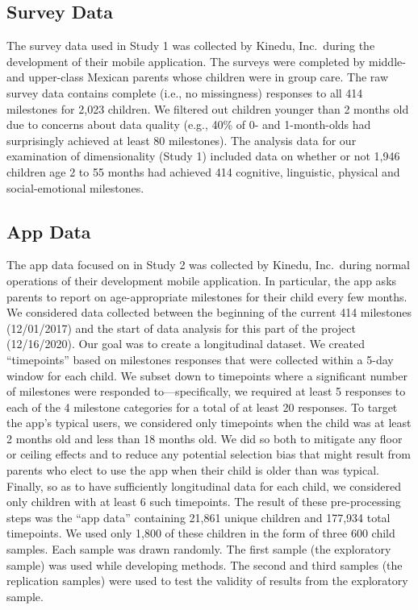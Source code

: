 \documentclass[man]{apa7}
\begin{document}
\subsection*{Survey Data}

The survey data used in Study 1 was collected by Kinedu, Inc.~during the
development of their mobile application. The surveys were completed by
middle- and upper-class Mexican parents whose children were in group
care. The raw survey data contains complete (i.e., no missingness)
responses to all 414 milestones for 2,023 children. We filtered out
children younger than 2 months old due to concerns about data quality
(e.g., 40\% of 0- and 1-month-olds had surprisingly achieved at least 80
milestones). The analysis data for our examination of dimensionality
(Study 1) included data on whether or not 1,946 children age 2 to 55
months had achieved 414 cognitive, linguistic, physical and
social-emotional milestones.

\subsection*{App Data}

The app data focused on in Study 2 was collected by Kinedu, Inc.~during
normal operations of their development mobile application. In
particular, the app asks parents to report on age-appropriate milestones
for their child every few months. We considered data collected between
the beginning of the current 414 milestones (12/01/2017) and the start
of data analysis for this part of the project (12/16/2020). Our goal was
to create a longitudinal dataset. We created ``timepoints'' based on
milestones responses that were collected within a 5-day window for each
child. We subset down to timepoints where a significant number of
milestones were responded to---specifically, we required at least 5
responses to each of the 4 milestone categories for a total of at least
20 responses. To target the app's typical users, we considered only
timepoints when the child was at least 2 months old and less than 18
months old. We did so both to mitigate any floor or ceiling effects and
to reduce any potential selection bias that might result from parents
who elect to use the app when their child is older than was typical.
Finally, so as to have sufficiently longitudinal data for each child, we
considered only children with at least 6 such timepoints. The result of
these pre-processing steps was the ``app data'' containing 21,861 unique
children and 177,934 total timepoints. We used only 1,800 of these
children in the form of three 600 child samples. Each sample was drawn
randomly. The first sample (the exploratory sample) was used while
developing methods. The second and third samples (the replication
samples) were used to test the validity of results from the exploratory
sample.
\end{document}
